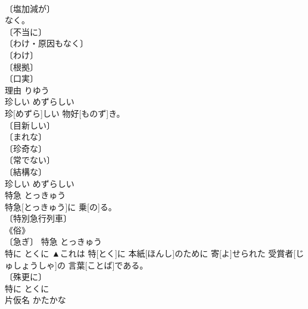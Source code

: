 \documentclass[8pt]{extreport}
\begin{document}
\begin{CJK}{UTF8}{min}
\\	〔塩加減が〕 
\\	[《文》 
\\	〔うっとりと快い〕 
\\	〔おだてるような・誠意のない〕 
\\	《文》 
\\	《文》 
\\	〔言いくるめるような〕 
\\	〔魅力的な〕 
\\	〔甘やかす〕 
\\	〔厳しくない〕 
\\	〔浅薄な〕 
\\	〔のん気な〕 
\\	〔与(くみ)しやすい〕 
\\	〔(野球などで)打ちやすい〕 
\\	〔鋭くない〕 
\\	〔(栓などが)ゆるい〕 
\\	【相場】 
\\	甘い	あまい	
\\	理由	りゆう	
\\	理由[りゆう]なく。	
\\	〔不当に〕 
\\	〔わけ・原因もなく〕 
\\	〔わけ〕 
\\	〔根拠〕 
\\	〔口実〕 
\\	理由	りゆう	
\\	珍しい	めずらしい	
\\	珍[めずら]しい 物好[ものず]き。	
\\	〔目新しい〕 
\\	〔まれな〕 
\\	〔珍奇な〕 
\\	〔常でない〕 
\\	〔結構な〕 
\\	珍しい	めずらしい	
\\	特急	とっきゅう	
\\	特急[とっきゅう]に 乗[の]る。	
\\	〔特別急行列車〕 
\\	《俗》 
\\	〔急ぎ〕	特急	とっきゅう	
\\	特に	とくに	▲これは 特[とく]に 本紙[ほんし]のために 寄[よ]せられた 受賞者[じゅしょうしゃ]の 言葉[ことば]である。	
\\	〔殊更に〕 
\\	[⇒とくべつ]	特に	とくに	
\\	片仮名	かたかな	

\end{CJK}
\end{document}
